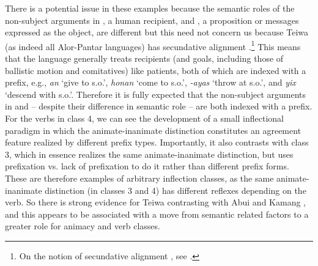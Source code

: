 There is a potential issue in these examples because the semantic roles of the non-subject arguments in , a human recipient, and , a proposition or messages expressed as the object, are different but this need not concern us because Teiwa  (as indeed all Alor-Pantar languages) has secundative alignment \citep[449,454]{Klamer2010b}.\footnote{On the notion of secundative alignment , see \citet{Dryer1986}.} This means that the language generally treats recipients (and goals, including those of ballistic motion and comitatives) like patients, both of which are indexed with a prefix, e.g., \textit{an} `give to s.o.', \textit{honan} `come to s.o.', \textit{{}-ayas} `throw at s.o.', and \textit{yix} `descend with s.o.'. Therefore it is fully expected that the non-subject arguments in  and  -- despite their difference in semantic role -- are both indexed with a prefix. For the verbs in class 4, we can see the development of a small inflectional paradigm in which the animate-inanimate distinction constitutes an agreement  feature realized by different prefix types. Importantly, it also contrasts with class 3, which in essence realizes the same animate-inanimate  distinction, but uses prefixation vs. lack of prefixation to do it rather than different prefix forms. These are therefore examples of arbitrary inflection classes, as the same animate-inanimate distinction (in classes 3 and 4) has different reflexes depending on the verb. So there is strong evidence for Teiwa  contrasting with Abui  and Kamang , and this appears to be associated with a move from semantic related factors to a greater role for animacy and verb classes. 

